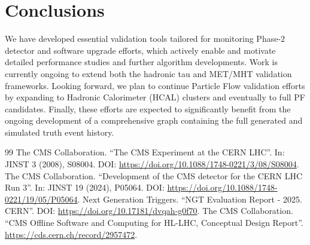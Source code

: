 \documentclass[a4paper,11pt]{article}
\begin{document}
\section{Conclusions}
\label{sec:conclusions}
%
We have developed essential validation tools tailored for monitoring Phase-2 detector and software upgrade efforts, which actively enable and motivate detailed performance studies and further algorithm developments. Work is currently ongoing to extend both the hadronic tau and MET/MHT validation frameworks. Looking forward, we plan to continue Particle Flow validation efforts by expanding to Hadronic Calorimeter (HCAL) clusters and eventually to full PF candidates.
Finally, these efforts are expected to significantly benefit from the ongoing development of a comprehensive graph containing the full generated and simulated truth event history.
%
\begin{thebibliography}{99}
  The CMS Collaboration. ``The CMS Experiment at the CERN LHC''. In: JINST 3 (2008), S08004. DOI: \url{https://doi.org/10.1088/1748-0221/3/08/S08004}.
  The CMS Collaboration. ``Development of the CMS detector for the CERN LHC Run 3''. In: JINST 19 (2024), P05064. DOI: \url{https://doi.org/10.1088/1748-0221/19/05/P05064}.
  Next Generation Triggers. ``NGT Evaluation Report - 2025. CERN''. DOI: \url{https://doi.org/10.17181/dvqah-g0f70}.
  The CMS Collaboration. ``CMS Offline Software and Computing for HL-LHC, Conceptual Design Report''. \url{https://cds.cern.ch/record/2957472}.
\end{thebibliography}
%
\end{document}
